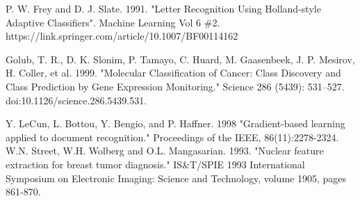 \documentclass[letterpaper, 11pt]{article}
\begin{document}
P. W. Frey and D. J. Slate. 1991. "Letter Recognition Using Holland-style Adaptive Classifiers". Machine Learning Vol 6 \#2. https://link.springer.com/article/10.1007/BF00114162

Golub, T. R., D. K. Slonim, P. Tamayo, C. Huard, M. Gaasenbeek, J. P. Mesirov, H. Coller, et al. 1999. "Molecular Classification of Cancer: Class Discovery and Class Prediction by Gene Expression Monitoring." Science 286 (5439): 531–527. doi:10.1126/science.286.5439.531.

Y. LeCun, L. Bottou, Y. Bengio, and P. Haffner. 1998 "Gradient-based learning applied to document recognition." Proceedings of the IEEE, 86(11):2278-2324.
W.N. Street, W.H. Wolberg and O.L. Mangasarian. 1993. "Nuclear feature extraction for breast tumor diagnosis." IS\&T/SPIE 1993 International Symposium on Electronic Imaging: Science and Technology, volume 1905, pages 861-870.
\end{document}
